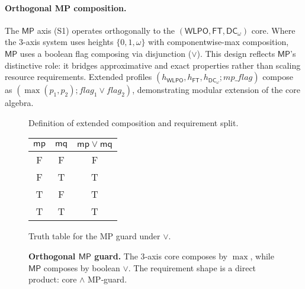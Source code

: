 \documentclass[11pt]{article}
\newcommand{\WLPO}{\mathsf{WLPO}}
\newcommand{\FT}{\mathsf{FT}}
\newcommand{\DCw}{\mathsf{DC}_{\omega}}
\newcommand{\MP}{\mathsf{MP}}
\theoremstyle{plain}
\theoremstyle{definition}
\theoremstyle{remark}
\begin{document}
\paragraph{Orthogonal MP composition.}
The $\MP$ axis (S1) operates orthogonally to the $(\WLPO, \FT, \DCw)$ core. Where the 3-axis system uses heights $\{0,1,\omega\}$ with componentwise-max composition, $\MP$ uses a boolean flag composing via disjunction ($\lor$). This design reflects $\MP$'s distinctive role: it bridges approximative and exact properties rather than scaling resource requirements. Extended profiles $(h_{\WLPO}, h_{\FT}, h_{\DCw}; \mathit{mp\_flag})$ compose as $(\max(p_1, p_2); \mathit{flag}_1 \lor \mathit{flag}_2)$, demonstrating modular extension of the core algebra.

\begin{figure}[t]
  \centering
  \begin{minipage}[t]{0.47\linewidth}
    \centering
    \vspace{0.6em}

    \small Definition of extended composition and requirement split.
  \end{minipage}\hfill
  \begin{minipage}[t]{0.47\linewidth}
    \centering
    \setlength{\tabcolsep}{10pt}
    \renewcommand{\arraystretch}{1.2}
    \begin{tabular}{cc|c}
      $\mathsf{mp}$ & $\mathsf{mq}$ & $\mathsf{mp}\lor\mathsf{mq}$ \\\hline
      F & F & F \\
      F & T & T \\
      T & F & T \\
      T & T & T \\
    \end{tabular}

    \vspace{0.6em}
    \small Truth table for the MP guard under $\lor$.
  \end{minipage}

  \caption{\textbf{Orthogonal $\MP$ guard.}
  The 3‑axis core composes by $\max$, while $\MP$ composes by boolean $\lor$.
  The requirement shape is a direct product: core $\wedge$ MP‑guard.}
  \label{fig:mp-orthogonal}
\end{figure}
\end{document}
